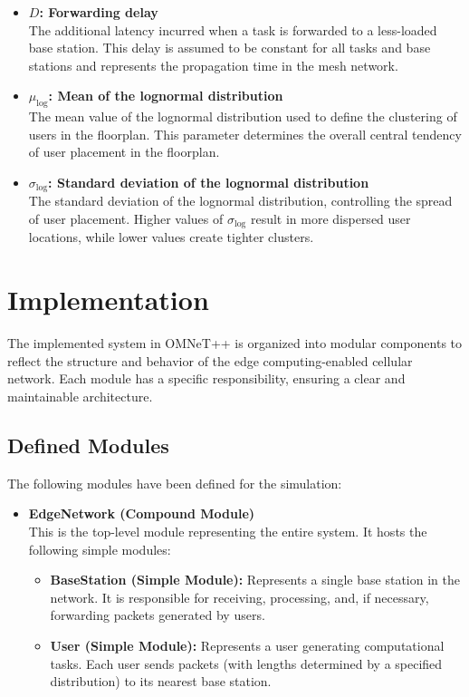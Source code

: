 \documentclass{report}
\begin{document}
\begin{itemize}
    \item \textbf{$D$: Forwarding delay} \\
    The additional latency incurred when a task is forwarded to a less-loaded base station. This delay is assumed to be constant for all tasks and base stations and represents the propagation time in the mesh network.

    \item \textbf{$\mu_{\text{log}}$: Mean of the lognormal distribution} \\
    The mean value of the lognormal distribution used to define the clustering of users in the floorplan. This parameter determines the overall central tendency of user placement in the floorplan.

    \item \textbf{$\sigma_{\text{log}}$: Standard deviation of the lognormal distribution} \\
    The standard deviation of the lognormal distribution, controlling the spread of user placement. Higher values of $\sigma_{\text{log}}$ result in more dispersed user locations, while lower values create tighter clusters.
\end{itemize}

\chapter{Implementation}

The implemented system in OMNeT++ is organized into modular components to reflect the structure and behavior of the edge computing-enabled cellular network. Each module has a specific responsibility, ensuring a clear and maintainable architecture.

\section{Defined Modules}

The following modules have been defined for the simulation:

\begin{itemize}
    \item \textbf{EdgeNetwork (Compound Module)} \\
    This is the top-level module representing the entire system. It hosts the following simple modules:
    \begin{itemize}
        \item \textbf{BaseStation (Simple Module):} Represents a single base station in the network. It is responsible for receiving, processing, and, if necessary, forwarding packets generated by users.
        \item \textbf{User (Simple Module):} Represents a user generating computational tasks. Each user sends packets (with lengths determined by a specified distribution) to its nearest base station.
    \end{itemize}
\end{itemize}
\end{document}
